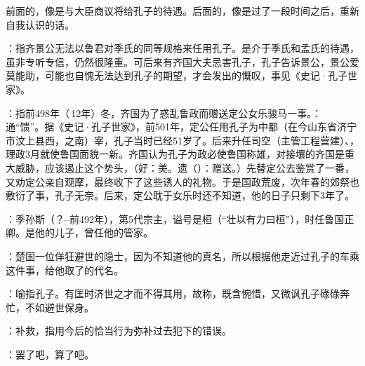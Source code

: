 {
\item 前面的，像是与大臣商议将给孔子的待遇。后面的，像是过了一段时间之后，重新自我认识的话。
\item {}：指齐景公无法以鲁君对季氏的同等规格来任用孔子。是介于季氏和孟氏的待遇，虽非专听专信，仍然很隆重。可后来有齐国大夫忌害孔子，孔子告诉景公，景公爱莫能助，可能也自愧无法达到孔子的期望，才会发出的慨叹，事见《史记·孔子世家》。
}
{}


{
\item {}：指前498年（\,12年）冬，齐国为了惑乱鲁政而赠送定公女乐骏马一事。：通“馈”。据《史记·孔子世家》，前501年，定公任用孔子为中都（在今山东省济宁市汶上县西，之南）宰，孔子当时已经51岁了。后来升任司空（主管工程营建）、，理政3月就使鲁国面貌一新。齐国认为孔子为政必使鲁国称雄，对接壤的齐国是重大威胁，应该遏止这个势头，（好：美。遗（）：赠送。）先替定公去鉴赏了一番，又劝定公亲自观摩，最终收下了这些诱人的礼物。于是国政荒废，次年春的郊祭也敷衍了事，孔子无奈。后来，定公耽于女乐时还不知道，他的日子只剩下3年了。

\item {}：季孙斯（？--前492年），第5代宗主，谥号是桓（“壮以有力曰桓”），时任鲁国正卿。是他的儿子，曾任他的管家。
}
{}


{
\item {}：楚国一位佯狂避世的隐士，因为不知道他的真名，所以根据他走近过孔子的车乘这件事，给他取了的代名。
\item {}：喻指孔子。有匡时济世之才而不得其用，故称，既含惋惜，又微讽孔子碌碌奔忙，不如避世保身。%
\item {}：补救，指用今后的恰当行为弥补过去犯下的错误。
\item {}：罢了吧，算了吧。
}
{}


